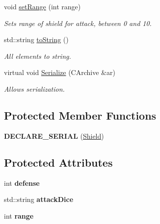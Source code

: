 \begin{DoxyCompactItemize}
\hypertarget{class_shield_a7e0638047be589b3ab2ca0c1349f3409}{}\label{class_shield_a7e0638047be589b3ab2ca0c1349f3409} 
void \hyperlink{class_shield_a7e0638047be589b3ab2ca0c1349f3409}{set\+Range} (int range)
\begin{DoxyCompactList}\small\item\em Sets range of shield for attack, between 0 and 10. \end{DoxyCompactList}\item 
\hypertarget{class_shield_a524d5884f91f2539db047cecd09d6bc8}{}\label{class_shield_a524d5884f91f2539db047cecd09d6bc8} 
std\+::string \hyperlink{class_shield_a524d5884f91f2539db047cecd09d6bc8}{to\+String} ()
\begin{DoxyCompactList}\small\item\em All elements to string. \end{DoxyCompactList}\item 
\hypertarget{class_shield_a8d045c43b16aab5fc474e696cb8a7f1f}{}\label{class_shield_a8d045c43b16aab5fc474e696cb8a7f1f} 
virtual void \hyperlink{class_shield_a8d045c43b16aab5fc474e696cb8a7f1f}{Serialize} (C\+Archive \&ar)
\begin{DoxyCompactList}\small\item\em Allows serialization. \end{DoxyCompactList}\end{DoxyCompactItemize}
\subsection*{Protected Member Functions}
\begin{DoxyCompactItemize}
\item 
\hypertarget{class_shield_a0bc1e651aeb25fcecd483c76a847bb61}{}\label{class_shield_a0bc1e651aeb25fcecd483c76a847bb61} 
{\bfseries D\+E\+C\+L\+A\+R\+E\+\_\+\+S\+E\+R\+I\+AL} (\hyperlink{class_shield}{Shield})
\end{DoxyCompactItemize}
\subsection*{Protected Attributes}
\begin{DoxyCompactItemize}
\item 
\hypertarget{class_shield_af22e87b1ecaf100736797e30df248a8e}{}\label{class_shield_af22e87b1ecaf100736797e30df248a8e} 
int {\bfseries defense}
\item 
\hypertarget{class_shield_a4bcf1d65dc7b666ffc5ca465c37d98b9}{}\label{class_shield_a4bcf1d65dc7b666ffc5ca465c37d98b9} 
std\+::string {\bfseries attack\+Dice}
\item 
\hypertarget{class_shield_ad5c23fb3c974dd066b089a2841c4e2dd}{}\label{class_shield_ad5c23fb3c974dd066b089a2841c4e2dd} 
int {\bfseries range}
\end{DoxyCompactItemize}


